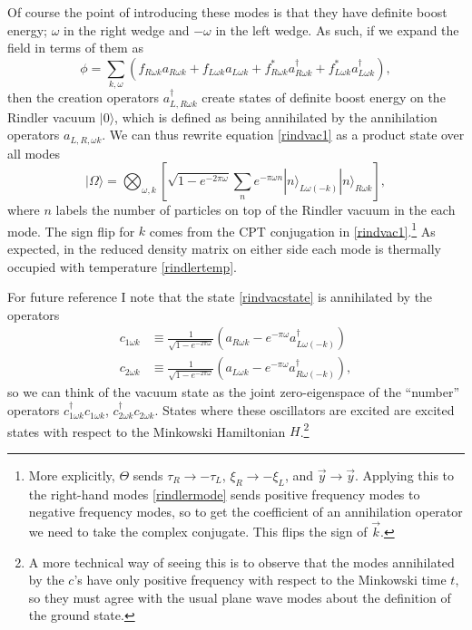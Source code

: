 \documentclass[12pt]{article}
\newcommand{\be}{\begin{equation}}
\newcommand{\ee}{\end{equation}}
\newcommand{\ran}{\rangle}
\begin{document}
Of course the point of introducing these modes is that they have definite boost energy; $\omega$ in the right wedge and $-\omega$ in the left wedge.  As such, if we expand the field in terms of them as
\be
\phi=\sum_{k,\omega}\left(f_{R\omega k}a_{R\omega k}+f_{L\omega k}a_{L\omega k}+f_{R\omega k}^*a_{R\omega k}^\dagger+f^*_{L\omega k}a_{L\omega k}^\dagger\right),
\ee
then the creation operators $a_{L,R \omega k}^\dagger$ create states of definite boost energy on the Rindler vacuum $|0\ran$, which is defined as being annihilated by the annihilation operators $a_{L,R,\omega k}$.  We can thus rewrite equation \eqref{rindvac1} as a product state over all modes
\be\label{rindvacstate}
|\Omega\ran=\bigotimes_{\omega,k}\left[\sqrt{1-e^{-2\pi\omega}}\sum_n e^{-\pi \omega n}|n\ran_{L \omega (-k)}|n\ran_{R \omega k}\right],
\ee
where $n$ labels the number of particles on top of the Rindler vacuum in the each mode.  The sign flip for $k$ comes from the CPT conjugation in \eqref{rindvac1}.\footnote{More explicitly, $\Theta$ sends $\tau_R\to-\tau_L$, $\xi_R\to -\xi_L$, and $\vec{y}\to \vec{y}$.  Applying this to the right-hand modes \eqref{rindlermode} sends positive frequency modes to negative frequency modes, so to get the coefficient of an annihilation operator we need to take the complex conjugate.  This flips the sign of $\vec{k}$.}  As expected, in the reduced density matrix on either side each mode is thermally occupied with temperature \eqref{rindlertemp}.  

For future reference I note that the state \eqref{rindvacstate} is annihilated by the operators
\begin{align}\nonumber
c_{1\omega k}&\equiv \frac{1}{\sqrt{1-e^{-2\pi \omega}}}\left(a_{R\omega k}-e^{-\pi \omega} a_{L\omega (-k)}^\dagger\right)\\
c_{2\omega k}&\equiv \frac{1}{\sqrt{1-e^{-2\pi \omega}}}\left(a_{L\omega k}-e^{-\pi \omega} a_{R\omega (-k)}^\dagger\right),\label{cmodes}
\end{align}
so we can think of the vacuum state as the joint zero-eigenspace of the ``number'' operators $c_{1\omega k}^\dagger c_{1\omega k}$, $c_{2\omega k}^\dagger c_{2\omega k}$.  States where these oscillators are excited are excited states with respect to the Minkowski Hamiltonian $H$.\footnote{A more technical way of seeing this is to observe that the modes annihilated by the $c$'s have only positive frequency with respect to the Minkowski time $t$, so they must agree with the usual plane wave modes about the definition of the ground state.}
\end{document}

